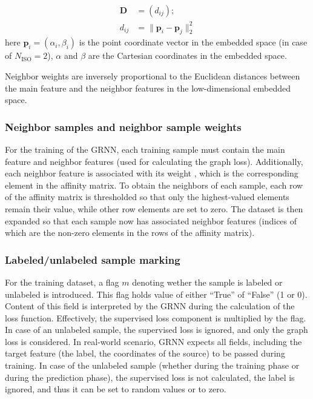 \documentclass[applsci,article,submit,moreauthors,pdftex]{Definitions/mdpi}
\begin{document}
\begin{align}
	\mathbf{D} &= (d_{ij});\\
	d_{ij} &= \lVert \mathbf{p}_{i}-\mathbf{p}_{j} \rVert _{2}^{2}
\end{align}
here $ \mathbf{p}_{i} = (\alpha_i, \beta_i) $ is the point coordinate vector in the embedded space (in case of $ N_{\mathrm{ISO}} = 2 $), $ \alpha $ and $ \beta $ are the Cartesian coordinates in the embedded space.

Neighbor weights are inversely proportional to the Euclidean distances between the main feature and the neighbor features in the low-dimensional embedded space.

\subsubsection{Neighbor samples and neighbor sample weights}
For the training of the GRNN, each training sample must contain the main \srpphat{} feature and \gnbrs{} neighbor \srpphat{} features (used for calculating the graph loss). Additionally, each neighbor feature is associated with its weight \nbrweigth{}, which is the corresponding element in the affinity matrix.
To obtain the \gnbrs{} neighbors of each sample, each row of the affinity matrix is thresholded so that only the \gnbrs{} highest-valued elements remain their value, while other row elements are set to zero.
The dataset is then expanded so that each sample now has associated neighbor \srpphat{} features (indices of which are the non-zero elements in the rows of the affinity matrix). 


\subsubsection{Labeled/unlabeled sample marking}
For the training dataset, a flag $ m $ denoting wether the sample is labeled or unlabeled is introduced. This flag holds value of either ``True'' of ``False'' (1 or 0). Content of this field is interpreted by the GRNN during the calculation of the loss function. Effectively, the supervised loss component is multiplied by the flag. In case of an unlabeled sample, the supervised loss is ignored, and only the graph loss is considered. In real-world scenario, GRNN expects all fields, including the target feature (the label, the coordinates of the source) to be passed during training. In case of the unlabeled sample (whether during the training phase or during the prediction phase), the supervised loss is not calculated, the label is ignored, and thus it can be set to random values or to zero. 
\end{document}
